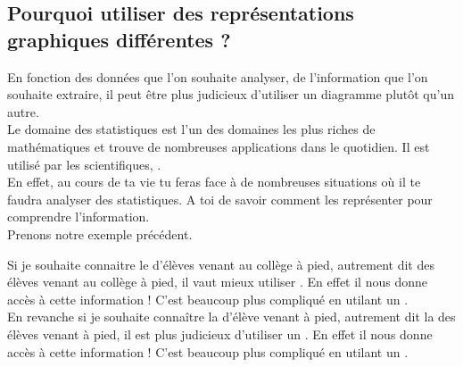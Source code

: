 \subsection{Pourquoi utiliser des représentations graphiques différentes ?}
\begin{remarquebox}
    En fonction des données que l'on souhaite analyser, de l'information
    que l'on souhaite extraire, il peut être plus judicieux d'utiliser un
    diagramme plutôt qu'un autre. \\

    Le domaine des statistiques est l'un des domaines les plus riches de
    mathématiques et trouve de nombreuses applications dans le quotidien. Il est
    utilisé par les scientifiques, . \\

    En effet, au cours de ta vie tu feras face à de nombreuses situations où il
    te faudra analyser des statistiques. A toi de savoir comment les représenter
    pour comprendre l'information. \\

    Prenons notre exemple précédent.
\end{remarquebox}

\begin{exempleboxsuite}
    Si je souhaite connaitre le  d'élèves venant au collège à pied,
    autrement dit  des élèves venant au collège à pied, il
    vaut mieux utiliser . En effet il nous
    donne  accès à cette information ! C'est beaucoup plus compliqué
    en utilant un . \\

    En revanche si je souhaite connaître la  d'élève venant à
    pied, autrement dit la  des élèves venant à pied, il est plus
    judicieux d'utiliser un . En effet il nous
    donne  accès à cette information ! C'est beaucoup plus compliqué
    en utilant un . \\
\end{exempleboxsuite}
